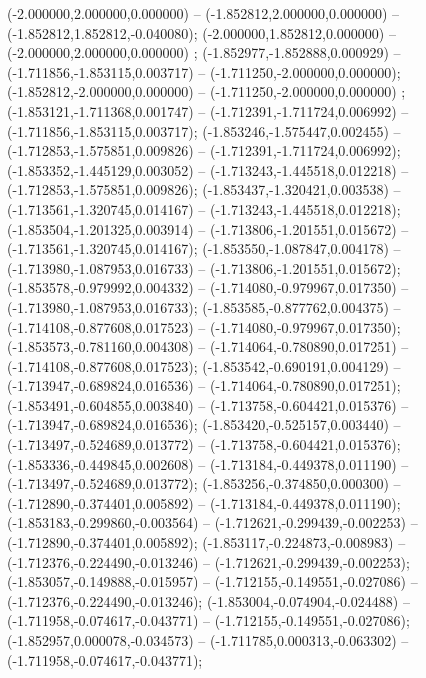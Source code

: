  (-2.000000,2.000000,0.000000) -- (-1.852812,2.000000,0.000000) -- (-1.852812,1.852812,-0.040080);
 (-2.000000,1.852812,0.000000) -- (-2.000000,2.000000,0.000000) ;
 (-1.852977,-1.852888,0.000929) -- (-1.711856,-1.853115,0.003717) -- (-1.711250,-2.000000,0.000000);
 (-1.852812,-2.000000,0.000000) -- (-1.711250,-2.000000,0.000000) ;
 (-1.853121,-1.711368,0.001747) -- (-1.712391,-1.711724,0.006992) -- (-1.711856,-1.853115,0.003717);
 (-1.853246,-1.575447,0.002455) -- (-1.712853,-1.575851,0.009826) -- (-1.712391,-1.711724,0.006992);
 (-1.853352,-1.445129,0.003052) -- (-1.713243,-1.445518,0.012218) -- (-1.712853,-1.575851,0.009826);
 (-1.853437,-1.320421,0.003538) -- (-1.713561,-1.320745,0.014167) -- (-1.713243,-1.445518,0.012218);
 (-1.853504,-1.201325,0.003914) -- (-1.713806,-1.201551,0.015672) -- (-1.713561,-1.320745,0.014167);
 (-1.853550,-1.087847,0.004178) -- (-1.713980,-1.087953,0.016733) -- (-1.713806,-1.201551,0.015672);
 (-1.853578,-0.979992,0.004332) -- (-1.714080,-0.979967,0.017350) -- (-1.713980,-1.087953,0.016733);
 (-1.853585,-0.877762,0.004375) -- (-1.714108,-0.877608,0.017523) -- (-1.714080,-0.979967,0.017350);
 (-1.853573,-0.781160,0.004308) -- (-1.714064,-0.780890,0.017251) -- (-1.714108,-0.877608,0.017523);
 (-1.853542,-0.690191,0.004129) -- (-1.713947,-0.689824,0.016536) -- (-1.714064,-0.780890,0.017251);
 (-1.853491,-0.604855,0.003840) -- (-1.713758,-0.604421,0.015376) -- (-1.713947,-0.689824,0.016536);
 (-1.853420,-0.525157,0.003440) -- (-1.713497,-0.524689,0.013772) -- (-1.713758,-0.604421,0.015376);
 (-1.853336,-0.449845,0.002608) -- (-1.713184,-0.449378,0.011190) -- (-1.713497,-0.524689,0.013772);
 (-1.853256,-0.374850,0.000300) -- (-1.712890,-0.374401,0.005892) -- (-1.713184,-0.449378,0.011190);
 (-1.853183,-0.299860,-0.003564) -- (-1.712621,-0.299439,-0.002253) -- (-1.712890,-0.374401,0.005892);
 (-1.853117,-0.224873,-0.008983) -- (-1.712376,-0.224490,-0.013246) -- (-1.712621,-0.299439,-0.002253);
 (-1.853057,-0.149888,-0.015957) -- (-1.712155,-0.149551,-0.027086) -- (-1.712376,-0.224490,-0.013246);
 (-1.853004,-0.074904,-0.024488) -- (-1.711958,-0.074617,-0.043771) -- (-1.712155,-0.149551,-0.027086);
 (-1.852957,0.000078,-0.034573) -- (-1.711785,0.000313,-0.063302) -- (-1.711958,-0.074617,-0.043771);
